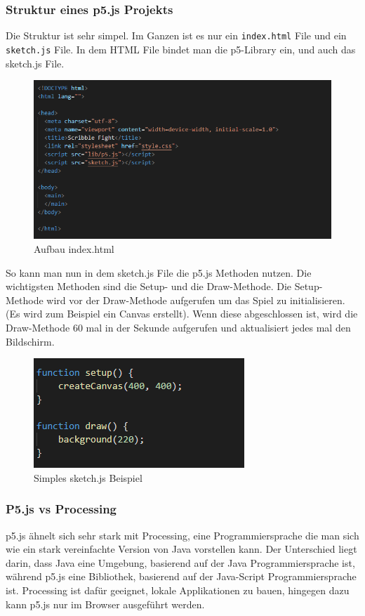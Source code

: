 \subsubsection{Struktur eines p5.js Projekts}
Die Struktur ist sehr simpel. Im Ganzen ist es nur ein \texttt{index.html} File und ein \texttt{sketch.js} File. In dem HTML File bindet man die p5-Library ein, und auch das sketch.js File.

\begin{figure}[H]
    \centering
    \includegraphics[scale=1]{pics/index html.PNG}
    \caption{Aufbau index.html}
\end{figure}

So kann man nun in dem sketch.js File die p5.js Methoden nutzen. Die wichtigsten Methoden sind die Setup- und die Draw-Methode.
Die Setup-Methode wird vor der Draw-Methode aufgerufen um das Spiel zu initialisieren. (Es wird zum Beispiel ein Canvas erstellt).
Wenn diese abgeschlossen ist, wird die Draw-Methode 60 mal in der Sekunde aufgerufen und aktualisiert jedes mal den Bildschirm.

\begin{figure}[H]
    \centering
    \includegraphics[scale=1]{pics/sketch.PNG}
    \caption{Simples sketch.js Beispiel}
\end{figure}

\subsubsection{P5.js vs Processing}
p5.js ähnelt sich sehr stark mit Processing, eine Programmiersprache die man sich wie ein stark vereinfachte Version von Java vorstellen kann.
Der Unterschied liegt darin, dass Java eine Umgebung, basierend auf der Java Programmiersprache ist, während p5.js eine Bibliothek, basierend auf der Java-Script Programmiersprache ist.
Processing ist dafür geeignet, lokale Applikationen zu bauen, hingegen dazu kann p5.js nur im Browser ausgeführt werden.

